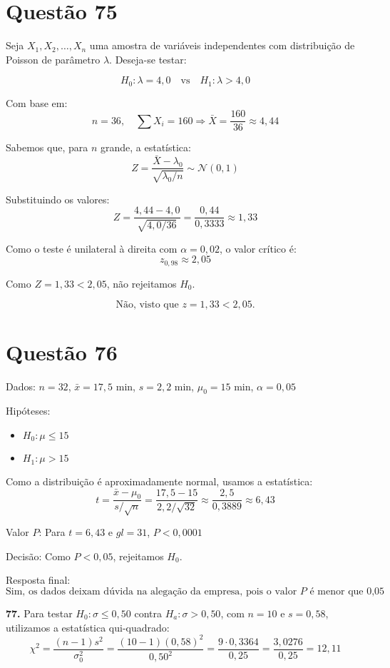 \documentclass[12pt]{article}
\newcommand{\quest}[1]{\section*{Questão #1}} %
\begin{document}
\quest{75}

Seja \( X_1, X_2, \ldots, X_n \) uma amostra de variáveis independentes com distribuição de Poisson de parâmetro \( \lambda \). Deseja-se testar:

\[
H_0: \lambda = 4,0 \quad \text{vs} \quad H_1: \lambda > 4,0
\]

Com base em:
\[
n = 36,\quad \sum X_i = 160 \Rightarrow \bar{X} = \frac{160}{36} \approx 4{,}44
\]

Sabemos que, para \( n \) grande, a estatística:
\[
Z = \frac{\bar{X} - \lambda_0}{\sqrt{\lambda_0/n}} \sim \mathcal{N}(0,1)
\]

Substituindo os valores:
\[
Z = \frac{4{,}44 - 4{,}0}{\sqrt{4{,}0 / 36}} = \frac{0{,}44}{0{,}3333} \approx 1{,}33
\]

Como o teste é unilateral à direita com \( \alpha = 0{,}02 \), o valor crítico é:
\[
z_{0{,}98} \approx 2{,}05
\]

Como \( Z = 1{,}33 < 2{,}05 \), não rejeitamos \( H_0 \).

\[
\boxed{\text{Não, visto que } z = 1{,}33 < 2{,}05.}
\]

\quest{76}

Dados: $n = 32$, $\bar{x} = 17{,}5$ min, $s = 2{,}2$ min, $\mu_0 = 15$ min, $\alpha = 0{,}05$

Hip\'oteses:
\begin{itemize}
  \item $H_0: \mu \leq 15$
  \item $H_1: \mu > 15$
\end{itemize}

Como a distribui\c{c}\~ao \'{e} aproximadamente normal, usamos a estat\'istica:
\[
t = \frac{\bar{x} - \mu_0}{s / \sqrt{n}} = \frac{17{,}5 - 15}{2{,}2 / \sqrt{32}} \approx \frac{2{,}5}{0{,}3889} \approx 6{,}43
\]

Valor $P$: Para $t = 6{,}43$ e $gl = 31$, $P < 0{,}0001$

Decis\~ao: Como $P < 0{,}05$, rejeitamos $H_0$.

Resposta final:
\[
\boxed{\text{Sim, os dados deixam d\'uvida na alega\c{c}\~ao da empresa, pois o valor $P$ \'{e} menor que 0{,}05}}
\]

\textbf{77.} Para testar $H_0: \sigma \leq 0{,}50$ contra $H_a: \sigma > 0{,}50$, com $n = 10$ e $s = 0{,}58$, utilizamos a estatística qui-quadrado:
\[
\chi^2 = \frac{(n - 1) s^2}{\sigma_0^2} = \frac{(10 - 1)(0{,}58)^2}{0{,}50^2} = \frac{9 \cdot 0{,}3364}{0{,}25} = \frac{3{,}0276}{0{,}25} = 12{,}11
\]
\end{document}
